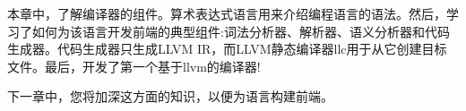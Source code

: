 本章中，了解编译器的组件。算术表达式语言用来介绍编程语言的语法。然后，学习了如何为该语言开发前端的典型组件:词法分析器、解析器、语义分析器和代码生成器。代码生成器只生成LLVM IR，而LLVM静态编译器llc用于从它创建目标文件。最后，开发了第一个基于llvm的编译器!\par

下一章中，您将加深这方面的知识，以便为语言构建前端。\par

\newpage
